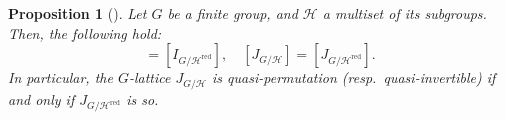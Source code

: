 \documentclass[12pt]{amsart}
\theoremstyle{plain}
\newtheorem{prop}[thm]{Proposition}
\theoremstyle{definition}
\newtheorem{dfn}[thm]{Definition}
\numberwithin{thm}{section}
\numberwithin{equation}{section}
\newcommand{\Z}{\mathbb{Z}}
\newcommand{\cH}{\mathcal{H}}
\DeclareMathOperator{\red}{red}
\DeclareMathOperator{\set}{set}
\begin{document}
\begin{prop}[{\cite[Corollary 3.13 (ii)]{Hasegawa}}]\label{prop:rdrd}
Let $G$ be a finite group, and $\cH$ a multiset of its subgroups. Then, the following hold: 
\begin{equation*}
    [I_{G/\cH}]=[I_{G/\cH^{\red}}],\quad [J_{G/\cH}]=[J_{G/\cH^{\red}}]. 
\end{equation*}
In particular, the $G$-lattice $J_{G/\cH}$ is quasi-permutation (resp.~quasi-invertible) if and only if $J_{G/\cH^{\red}}$ is so. 
\end{prop}

\end{document}
